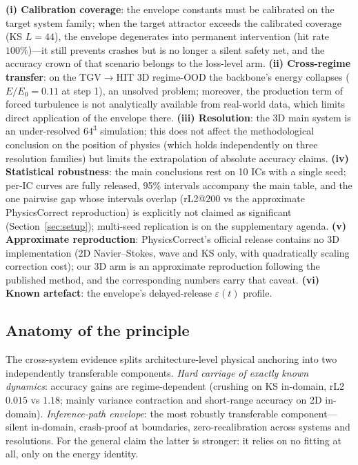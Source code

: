 \documentclass[11pt,a4paper]{article}
\begin{document}
\textbf{(i) Calibration coverage}: the envelope constants must be calibrated on the target system family; when the target attractor exceeds the calibrated coverage (KS $L{=}44$), the envelope degenerates into permanent intervention (hit rate $100\%$)---it still prevents crashes but is no longer a silent safety net, and the accuracy crown of that scenario belongs to the loss-level arm. \textbf{(ii) Cross-regime transfer}: on the TGV$\to$HIT 3D regime-OOD the backbone's energy collapses ($E/E_0=0.11$ at step 1), an unsolved problem; moreover, the production term of forced turbulence is not analytically available from real-world data, which limits direct application of the envelope there. \textbf{(iii) Resolution}: the 3D main system is an under-resolved $64^3$ simulation; this does not affect the methodological conclusion on the position of physics (which holds independently on three resolution families) but limits the extrapolation of absolute accuracy claims. \textbf{(iv) Statistical robustness}: the main conclusions rest on 10 ICs with a single seed; per-IC curves are fully released, 95\% intervals accompany the main table, and the one pairwise gap whose intervals overlap (rL2@200 vs the approximate PhysicsCorrect reproduction) is explicitly not claimed as significant (Section~\ref{sec:setup}); multi-seed replication is on the supplementary agenda. \textbf{(v) Approximate reproduction}: PhysicsCorrect's official release contains no 3D implementation (2D Navier--Stokes, wave and KS only, with quadratically scaling correction cost); our 3D arm is an approximate reproduction following the published method, and the corresponding numbers carry that caveat. \textbf{(vi) Known artefact}: the envelope's delayed-release $\varepsilon(t)$ profile.

\subsection{Anatomy of the principle}

The cross-system evidence splits architecture-level physical anchoring into two independently transferable components. \emph{Hard carriage of exactly known dynamics}: accuracy gains are regime-dependent (crushing on KS in-domain, rL2 $0.015$ vs $1.18$; mainly variance contraction and short-range accuracy on 2D in-domain). \emph{Inference-path envelope}: the most robustly transferable component---silent in-domain, crash-proof at boundaries, zero-recalibration across systems and resolutions. For the general claim the latter is stronger: it relies on no fitting at all, only on the energy identity.
\end{document}
